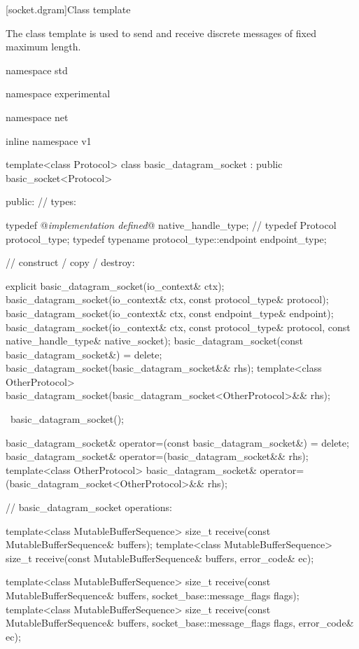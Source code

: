 %
[socket.dgram]{Class template }

\pnum
The class template  is used to send and receive discrete messages of fixed maximum length.

\begin{codeblock}
namespace std {
namespace experimental {
namespace net {
inline namespace v1 {

  template<class Protocol>
  class basic_datagram_socket : public basic_socket<Protocol>
  {
  public:
    // types:

    typedef @\textit{implementation defined}@ native_handle_type; // \nativeref
    typedef Protocol protocol_type;
    typedef typename protocol_type::endpoint endpoint_type;

    // construct / copy / destroy:

    explicit basic_datagram_socket(io_context& ctx);
    basic_datagram_socket(io_context& ctx, const protocol_type& protocol);
    basic_datagram_socket(io_context& ctx, const endpoint_type& endpoint);
    basic_datagram_socket(io_context& ctx, const protocol_type& protocol,
                          const native_handle_type& native_socket);
    basic_datagram_socket(const basic_datagram_socket&) = delete;
    basic_datagram_socket(basic_datagram_socket&& rhs);
    template<class OtherProtocol>
      basic_datagram_socket(basic_datagram_socket<OtherProtocol>&& rhs);

    ~basic_datagram_socket();

    basic_datagram_socket& operator=(const basic_datagram_socket&) = delete;
    basic_datagram_socket& operator=(basic_datagram_socket&& rhs);
    template<class OtherProtocol>
      basic_datagram_socket& operator=(basic_datagram_socket<OtherProtocol>&& rhs);

    // basic_datagram_socket operations:

    template<class MutableBufferSequence>
      size_t receive(const MutableBufferSequence& buffers);
    template<class MutableBufferSequence>
      size_t receive(const MutableBufferSequence& buffers,
                     error_code& ec);

    template<class MutableBufferSequence>
      size_t receive(const MutableBufferSequence& buffers,
                     socket_base::message_flags flags);
    template<class MutableBufferSequence>
      size_t receive(const MutableBufferSequence& buffers,
                     socket_base::message_flags flags, error_code& ec);

}}}}}
\end{codeblock}
